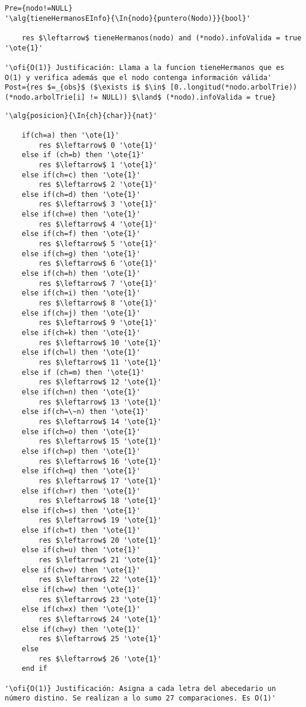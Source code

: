 \begin{lstlisting}[mathescape]
Pre={nodo!=NULL}
'\alg{tieneHermanosEInfo}{\In{nodo}{puntero(Nodo)}}{bool}'

	res $\leftarrow$ tieneHermanos(nodo) and (*nodo).infoValida = true '\ote{1}'

'\ofi{O(1)} Justificación: Llama a la funcion tieneHermanos que es O(1) y verifica además que el nodo contenga información válida'
Post={res $=_{obs}$ ($\exists i$ $\in$ [0..longitud(*nodo.arbolTrie)) (*nodo.arbolTrie[i] != NULL)) $\land$ (*nodo).infoValida = true}

\end{lstlisting}

\begin{lstlisting}[mathescape]
'\alg{posicion}{\In{ch}{char}}{nat}'

	if(ch=a) then '\ote{1}'
		res $\leftarrow$ 0 '\ote{1}'
	else if (ch=b) then '\ote{1}'
		res $\leftarrow$ 1 '\ote{1}'
	else if(ch=c) then '\ote{1}'
		res $\leftarrow$ 2 '\ote{1}'
	else if(ch=d) then '\ote{1}'
		res $\leftarrow$ 3 '\ote{1}'
	else if(ch=e) then '\ote{1}'
		res $\leftarrow$ 4 '\ote{1}'
	else if(ch=f) then '\ote{1}'
		res $\leftarrow$ 5 '\ote{1}'
	else if(ch=g) then '\ote{1}'
		res $\leftarrow$ 6 '\ote{1}'
	else if(ch=h) then '\ote{1}'
		res $\leftarrow$ 7 '\ote{1}'
	else if(ch=i) then '\ote{1}'
		res $\leftarrow$ 8 '\ote{1}'
	else if(ch=j) then '\ote{1}'
		res $\leftarrow$ 9 '\ote{1}'
	else if(ch=k) then '\ote{1}'
		res $\leftarrow$ 10 '\ote{1}'
	else if(ch=l) then '\ote{1}'
		res $\leftarrow$ 11 '\ote{1}'
	else if (ch=m) then '\ote{1}'
		res $\leftarrow$ 12 '\ote{1}'
	else if(ch=n) then '\ote{1}'
		res $\leftarrow$ 13 '\ote{1}'
	else if(ch=\~n) then '\ote{1}'
		res $\leftarrow$ 14 '\ote{1}'
	else if(ch=o) then '\ote{1}'
		res $\leftarrow$ 15 '\ote{1}'
	else if(ch=p) then '\ote{1}'
		res $\leftarrow$ 16 '\ote{1}'
	else if(ch=q) then '\ote{1}'
		res $\leftarrow$ 17 '\ote{1}'
	else if(ch=r) then '\ote{1}'
		res $\leftarrow$ 18 '\ote{1}'
	else if(ch=s) then '\ote{1}'
		res $\leftarrow$ 19 '\ote{1}'
    else if(ch=t) then '\ote{1}'
		res $\leftarrow$ 20 '\ote{1}'
    else if(ch=u) then '\ote{1}'
		res $\leftarrow$ 21 '\ote{1}'
    else if(ch=v) then '\ote{1}'
		res $\leftarrow$ 22 '\ote{1}'
	else if(ch=w) then '\ote{1}'
		res $\leftarrow$ 23 '\ote{1}'
	else if(ch=x) then '\ote{1}'
		res $\leftarrow$ 24 '\ote{1}'
    else if(ch=y) then '\ote{1}'
		res $\leftarrow$ 25 '\ote{1}'
	else
		res $\leftarrow$ 26 '\ote{1}'
	end if

'\ofi{O(1)} Justificación: Asigna a cada letra del abecedario un número distino. Se realizan a lo sumo 27 comparaciones. Es O(1)'

\end{lstlisting}